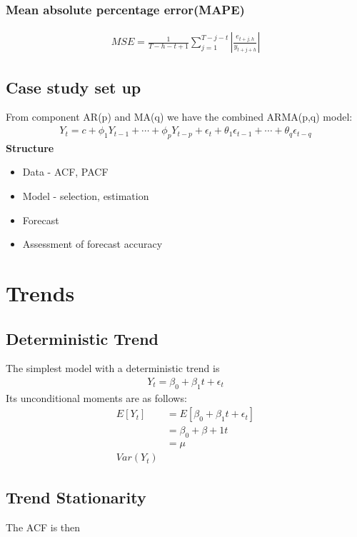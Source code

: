 \documentclass{article}
\theoremstyle{definition}
\theoremstyle{thrm}
\theoremstyle{lma}
\theoremstyle{ppst}
\theoremstyle{crlr}
\begin{document}
\subsubsection{Mean absolute percentage error(MAPE)}
\begin{align*}
	MSE = \frac{1}{T-h-t+1}\sum_{j=1}^{T-j-t}|\frac{e_{t+j,h}}{y_{t+j+h}}|
\end{align*}
\subsection{Case study set up}
From component AR(p) and MA(q) we have the combined ARMA(p,q) model:
\begin{align*}
	Y_t = c+\phi_1 Y_{t-1}+\cdots+\phi_p Y_{t-p}+\epsilon_t+\theta_1\epsilon_{t-1}+\cdots+\theta_q\epsilon_{t-q}
\end{align*}
\textbf{Structure}
\begin{itemize}
	\item Data - ACF, PACF
	\item Model - selection, estimation
	\item Forecast
	\item Assessment of forecast accuracy
\end{itemize}

\section{Trends}
\subsection{Deterministic Trend}
The simplest model with a deterministic trend is 
\begin{align*}
	Y_t = \beta_0+\beta_1t+\epsilon_t
\end{align*}
Its unconditional moments are as follows:
\begin{align*}
	E[Y_t] &= E[\beta_0+\beta_1t+\epsilon_t]\\
	&= \beta_0+\beta+1 t \\
	&=\mu\\
	Var(Y_t)
\end{align*}
\subsection{Trend Stationarity}
The ACF is then
\end{document}

